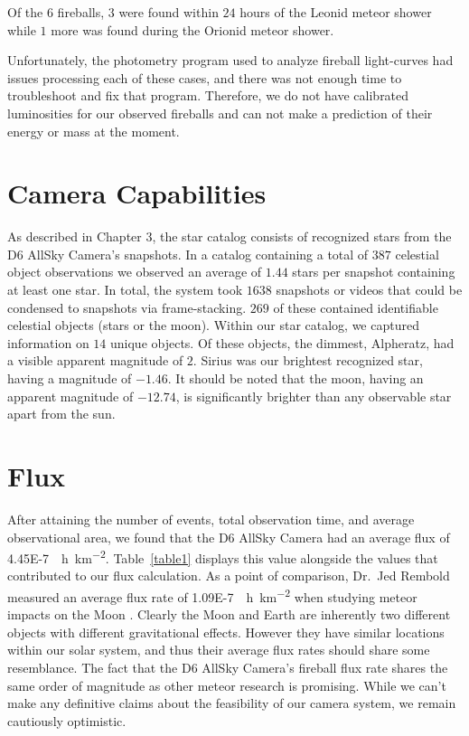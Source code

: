 Of the $6$ fireballs, $3$ were found within $24$ hours of the Leonid meteor shower while $1$ more was found during the Orionid meteor shower.  

Unfortunately, the photometry program used to analyze fireball light-curves had issues processing each of these cases, and there was not enough time to troubleshoot and fix that program.  
Therefore, we do not have calibrated luminosities for our observed fireballs and can not make a prediction of their energy or mass at the moment. 


\section{Camera Capabilities}

As described in Chapter 3, the star catalog consists of recognized stars from the D6 AllSky Camera's snapshots.
In a catalog containing a total of $387$ celestial object observations we observed an average of $1.44$ stars per snapshot containing at least one star.
In total, the system took $1638$ snapshots or videos that could be condensed to snapshots via frame-stacking.
$269$ of these contained identifiable celestial objects (stars or the moon).  
Within our star catalog, we captured information on $14$ unique objects.
Of these objects, the dimmest, Alpheratz, had a visible apparent magnitude of $2$. 
Sirius was our brightest recognized star, having a magnitude of $-1.46$.
It should be noted that the moon, having an apparent magnitude of $-12.74$, is significantly brighter than any observable star apart from the sun.


\section{Flux}

After attaining the number of events, total observation time, and average observational area, we found that the D6 AllSky Camera had an average flux of \SI{4.45E-7}{\per\hour\per\square\kilo\meter}.
Table~\ref{table1} displays this value alongside the values that contributed to our flux calculation. 
As a point of comparison, Dr.~Jed Rembold measured an average flux rate of \SI{1.09E-7}{\per\hour\per\square\kilo\meter} when studying meteor impacts on the Moon \cite{jed_dissertation_2014}. 
Clearly the Moon and Earth are inherently two different objects with different gravitational effects.
However they have similar locations within our solar system, and thus their average flux rates should share some resemblance.
The fact that the D6 AllSky Camera's fireball flux rate shares the same order of magnitude as other meteor research is promising.  
While we can't make any definitive claims about the feasibility of our camera system, we remain cautiously optimistic. 



